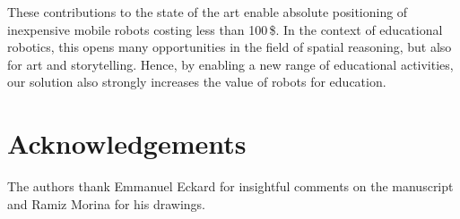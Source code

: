 \documentclass[letterpaper, 10pt, conference]{ieeeconf}
\begin{document}
These contributions to the state of the art enable absolute positioning of inexpensive mobile robots costing less than 100\,\$.
In the context of educational robotics, this opens many opportunities in the field of spatial reasoning, but also for art and storytelling.
Hence, by enabling a new range of educational activities, our solution also strongly increases the value of robots for education.

\section{Acknowledgements}

The authors thank Emmanuel Eckard for insightful comments on the manuscript and Ramiz Morina for his drawings.



\end{document}
